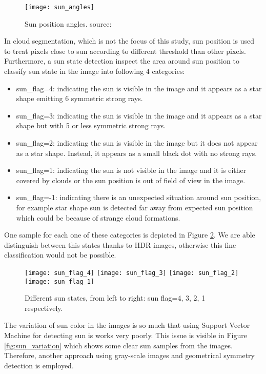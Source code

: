 \begin{figure}[h]
\caption{Sun position angles. source:\cite{sun_angle_pic}}
\label{fig:sun_position_angles}
\texttt{[image: sun\_angles]}
\centering
\end{figure}

In cloud segmentation, which is not the focus of this study, sun position is used to treat pixels close to sun according to different threshold than other pixels. Furthermore, a sun state detection inspect the area around sun position to classify sun state in the image into following 4 categories:
\begin{itemize}
\item sun\_flag=4: indicating the sun is visible in the image and it appears as a star shape emitting 6 symmetric strong rays.
\item sun\_flag=3: indicating the sun is visible in the image and it appears as a star shape but with 5 or less symmetric strong rays.
\item sun\_flag=2: indicating the sun is visible in the image but it does not appear as a star shape. Instead, it appears as a small black dot with no strong rays.
\item sun\_flag=1: indicating the sun is not visible in the image and it is either covered by clouds or the sun position is out of field of view in the image.
\item sun\_flag=-1: indicating there is an unexpected situation around sun position, for example star shape sun is detected far away from expected sun position which could be because of strange cloud formations.
\end{itemize}
One sample for each one of these categories is depicted in Figure \ref{fig:sun_states}. We are able distinguish between this states thanks to HDR images, otherwise this fine classification would not be possible.

\begin{figure}[h]
\caption{Different sun states, from left to right: sun flag=4, 3, 2, 1 respectively.}
\label{fig:sun_states}
\texttt{[image: sun\_flag\_4]}
\texttt{[image: sun\_flag\_3]}
\texttt{[image: sun\_flag\_2]}
\texttt{[image: sun\_flag\_1]}
\centering
\end{figure}

The variation of sun color in the images is so much that using Support Vector Machine for detecting sun is works very poorly. This issue is visible in Figure \ref{fig:sun_variation} which shows some clear sun samples from the images. Therefore, another approach using gray-scale images and geometrical symmetry detection is employed.

